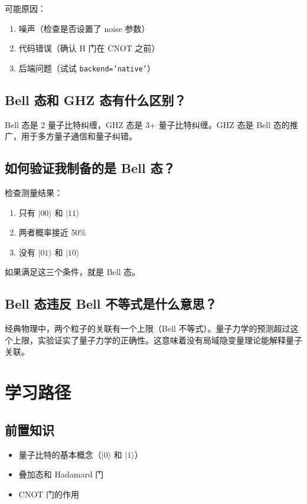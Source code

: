 \documentclass[12pt,a4paper]{article}
\begin{document}
可能原因：
\begin{enumerate}
  \item 噪声（检查是否设置了 noise 参数）
  \item 代码错误（确认 H 门在 CNOT 之前）
  \item 后端问题（试试 \texttt{backend='native'}）
\end{enumerate}

\subsection{Bell 态和 GHZ 态有什么区别？}

Bell 态是 2 量子比特纠缠，GHZ 态是 3+ 量子比特纠缠。GHZ 态是 Bell 态的推广，用于多方量子通信和量子纠错。

\subsection{如何验证我制备的是 Bell 态？}

检查测量结果：
\begin{enumerate}
  \item 只有 $|00\rangle$ 和 $|11\rangle$
  \item 两者概率接近 50\%
  \item 没有 $|01\rangle$ 和 $|10\rangle$
\end{enumerate}
如果满足这三个条件，就是 Bell 态。

\subsection{Bell 态违反 Bell 不等式是什么意思？}

经典物理中，两个粒子的关联有一个上限（Bell 不等式）。量子力学的预测超过这个上限，实验证实了量子力学的正确性。这意味着没有局域隐变量理论能解释量子关联。

\section{学习路径}

\subsection{前置知识}
\begin{itemize}
  \item 量子比特的基本概念（$|0\rangle$ 和 $|1\rangle$）
  \item 叠加态和 Hadamard 门
  \item CNOT 门的作用
\end{itemize}
\end{document}

